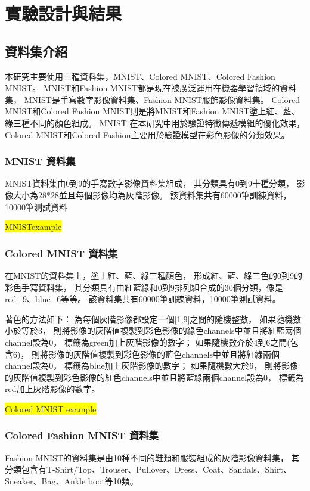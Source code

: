 \documentclass[class=NCU\_thesis, crop=false]{standalone}
\begin{document}
\chapter{實驗設計與結果}
\section{資料集介紹}
本研究主要使用三種資料集，MNIST、Colored MNIST、Colored Fashion MNIST。
MNIST和Fashion MNIST都是現在被廣泛運用在機器學習領域的資料集，
MNIST是手寫數字影像資料集、Fashion MNIST服飾影像資料集。 
Colored MNIST和Colored Fashion MNIST則是將MNIST和Fashion MNIST塗上紅、藍、綠三種不同的顏色組成。
MNIST 在本研究中用於驗證特徵傳遞模組的優化效果，
Colored MNIST和Colored Fashion主要用於驗證模型在彩色影像的分類效果。

    \subsection{MNIST 資料集}
    MNIST資料集由0到9的手寫數字影像資料集組成，
    其分類具有0到9十種分類，
    影像大小為28*28並且每個影像均為灰階影像。
    該資料集共有60000筆訓練資料，10000筆測試資料

    \colorbox {yellow}{MNISTexample}

    \subsection{Colored MNIST 資料集}
    在MNIST的資料集上，塗上紅、藍、綠三種顏色，
    形成紅、藍、綠三色的0到9的彩色手寫資料集，
    其分類具有由紅藍綠和0到9排列組合成的30個分類，像是red\_9、blue\_6等等。
    該資料集共有60000筆訓練資料，10000筆測試資料。

    著色的方法如下：
    為每個灰階影像都設定一個[1,9]之間的隨機整數，
    如果隨機數小於等於3，
    則將影像的灰階值複製到彩色影像的綠色channels中並且將紅藍兩個channel設為0，
    標籤為green加上灰階影像的數字；
    如果隨機數介於4到6之間(包含6)，
    則將影像的灰階值複製到彩色影像的藍色channels中並且將紅綠兩個channel設為0，
    標籤為blue加上灰階影像的數字；
    如果隨機數大於6，
    則將影像的灰階值複製到彩色影像的紅色channels中並且將藍綠兩個channel設為0，
    標籤為red加上灰階影像的數字。

    \colorbox {yellow}{Colored MNIST example}

    \subsection{Colored Fashion MNIST 資料集}
    Fashion MNIST的資料集是由10種不同的鞋類和服裝組成的灰階影像資料集，
    其分類包含有T-Shirt/Top、Trouser、Pullover、Dress、Coat、Sandals、Shirt、Sneaker、Bag、Ankle boot等10類。
\end{document}
